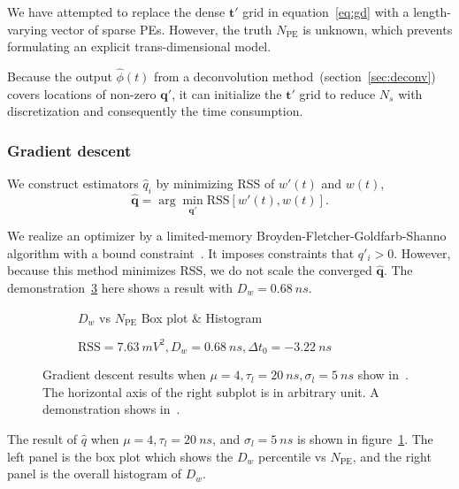 We have attempted to replace the dense $\bm{t'}$ grid in equation~\eqref{eq:gd} with a length-varying vector of sparse PEs. However, the truth $N_\mathrm{PE}$ is unknown, which prevents formulating an explicit trans-dimensional model. 

Because the output $\hat{\phi}(t)$ from a deconvolution method~(section~\ref{sec:deconv}) covers locations of non-zero $\bm{q}'$, it can initialize the $\bm{t}'$ grid to reduce $N_s$ with discretization and consequently the time consumption. 

\subsubsection{Gradient descent}

We construct estimators $\hat{q}_i$ by minimizing RSS of $w'(t)$ and $w(t)$, 
\begin{equation}
  \label{eq:gd-q}
  \bm{\hat{q}} = \arg \underset{\bm{q'}}{\min} \mathrm{RSS}\left[w'(t),w(t)\right].
\end{equation}

We realize an optimizer by a limited-memory Broyden-Fletcher-Goldfarb-Shanno algorithm with a bound constraint~\cite{byrd_limited_1995}. It imposes constraints that $q'_i > 0$. However, because this method minimizes RSS, we do not scale the converged $\bm{\hat{q}}$. The demonstration~\ref{fig:fitting} here shows a result with $D_w = \SI{0.68}{ns}$.

\begin{figure}[H]
  \begin{subfigure}{.5\textwidth}
    \centering
    \resizebox{\textwidth}{!}{}
    \caption{\label{fig:fitting-npe} $D_w$ vs $N_{\mathrm{PE}}$ Box plot \& Histogram}
  \end{subfigure}
  \begin{subfigure}{.5\textwidth}
    \centering
    \resizebox{\textwidth}{!}{}
    \caption{\label{fig:fitting}$\mathrm{RSS}=\SI{7.63}{mV^2},D_w=\SI{0.68}{ns},\Delta{t_0}=\SI{-3.22}{ns}$}
  \end{subfigure}
  \caption{Gradient descent results when $\mu=4, \tau_l=\SI{20}{ns}, \sigma_l=\SI{5}{ns}$ show in~. The horizontal axis of the right subplot is in arbitrary unit. A demonstration shows in~.}
\end{figure}

The result of $\hat{q}$ when $\mu=4, \tau_l=\SI{20}{ns}$, and $\sigma_l=\SI{5}{ns}$ is shown in figure~\ref{fig:fitting-npe}. The left panel is the box plot which shows the $D_w$ percentile vs $N_{\mathrm{PE}}$, and the right panel is the overall histogram of $D_w$. 

